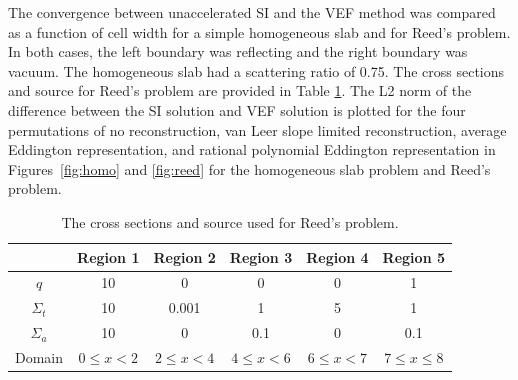 The convergence between unaccelerated SI and the VEF method was compared as a function of cell width for a simple homogeneous slab and for Reed's problem. In both cases, the left boundary was reflecting and the right boundary was vacuum. The homogeneous slab had a scattering ratio of 0.75. The cross sections and source for Reed's problem are provided in Table \ref{tab:reedXS}. The L2 norm of the difference between the SI solution and VEF solution is plotted for the four permutations of no reconstruction, van Leer slope limited reconstruction, average Eddington representation, and rational polynomial Eddington representation in Figures~\ref{fig:homo} and \ref{fig:reed} for the homogeneous slab problem and Reed's problem. 

	\begin{table} \centering
		\begin{tabular}{|c|c|c|c|c|c|}
			\hline
			& Region 1 & Region 2 & Region 3 & Region 4 & Region 5 \\ 
			\hline 
			$q$ & 10 & 0 & 0 & 0 & 1 \\ 
			$\Sigma_t$ & 10 & 0.001 & 1 & 5 & 1 \\ 
			$\Sigma_a$ & 10 & 0 & 0.1 & 0 & 0.1 \\ 
			\hline 
			Domain & $0 \leq x < 2$ & $2 \leq x < 4$ & $4\leq x < 6$ &
				$6 \leq x < 7$ & $7 \leq x \leq 8$\\ 
			\hline 
		\end{tabular}
		\caption{The cross sections and source used for Reed's problem.}
		\label{tab:reedXS}
	\end{table}

